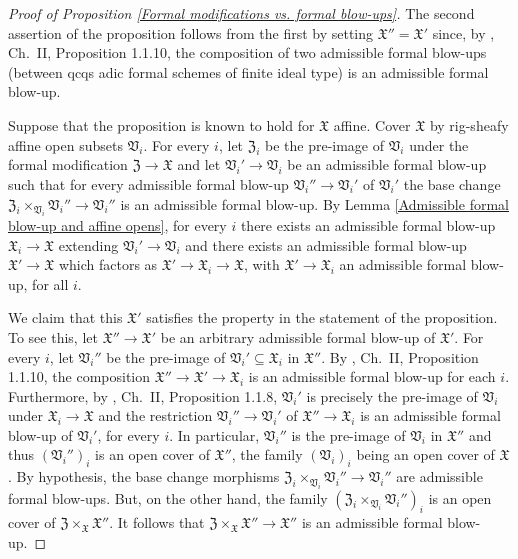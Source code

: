 \documentclass[12pt,twoside,a4paper]{article}
\theoremstyle{definition}
\theoremstyle{remark}
\begin{document}
\begin{proof}[Proof of Proposition \ref{Formal modifications vs. formal blow-ups}]The second assertion of the proposition follows from the first by setting $\mathfrak{X}''=\mathfrak{X}'$ since, by \cite{FK}, Ch.~II, Proposition 1.1.10, the composition of two admissible formal blow-ups (between qcqs adic formal schemes of finite ideal type) is an admissible formal blow-up. 

Suppose that the proposition is known to hold for $\mathfrak{X}$ affine. Cover $\mathfrak{X}$ by rig-sheafy affine open subsets $\mathfrak{V}_{i}$. For every $i$, let $\mathfrak{Z}_{i}$ be the pre-image of $\mathfrak{V}_{i}$ under the formal modification $\mathfrak{Z}\to\mathfrak{X}$ and let $\mathfrak{V}_{i}'\to\mathfrak{V}_{i}$ be an admissible formal blow-up such that for every admissible formal blow-up $\mathfrak{V}_{i}''\to\mathfrak{V}_{i}'$ of $\mathfrak{V}_{i}'$ the base change $\mathfrak{Z}_{i}\times_{\mathfrak{V}_{i}}\mathfrak{V}_{i}''\to\mathfrak{V}_{i}''$ is an admissible formal blow-up. By Lemma \ref{Admissible formal blow-up and affine opens}, for every $i$ there exists an admissible formal blow-up $\mathfrak{X}_{i}\to\mathfrak{X}$ extending $\mathfrak{V}_{i}'\to\mathfrak{V}_{i}$ and there exists an admissible formal blow-up $\mathfrak{X}'\to \mathfrak{X}$ which factors as $\mathfrak{X}'\to\mathfrak{X}_{i}\to\mathfrak{X}$, with $\mathfrak{X}'\to\mathfrak{X}_{i}$ an admissible formal blow-up, for all $i$. 

We claim that this $\mathfrak{X}'$ satisfies the property in the statement of the proposition. To see this, let $\mathfrak{X}''\to\mathfrak{X}'$ be an arbitrary admissible formal blow-up of $\mathfrak{X}'$. For every $i$, let $\mathfrak{V}_{i}''$ be the pre-image of $\mathfrak{V}_{i}'\subseteq \mathfrak{X}_{i}$ in $\mathfrak{X}''$. By \cite{FK}, Ch.~II, Proposition 1.1.10, the composition $\mathfrak{X}''\to\mathfrak{X}'\to \mathfrak{X}_{i}$ is an admissible formal blow-up for each $i$. Furthermore, by \cite{FK}, Ch.~II, Proposition 1.1.8, $\mathfrak{V}_{i}'$ is precisely the pre-image of $\mathfrak{V}_{i}$ under $\mathfrak{X}_{i}\to\mathfrak{X}$ and the restriction $\mathfrak{V}_{i}''\to \mathfrak{V}_{i}'$ of $\mathfrak{X}''\to\mathfrak{X}_{i}$ is an admissible formal blow-up of $\mathfrak{V}_{i}'$, for every $i$. In particular, $\mathfrak{V}_{i}''$ is the pre-image of $\mathfrak{V}_{i}$ in $\mathfrak{X}''$ and thus $(\mathfrak{V}_{i}'')_{i}$ is an open cover of $\mathfrak{X}''$, the family $(\mathfrak{V}_{i})_{i}$ being an open cover of $\mathfrak{X}$. By hypothesis, the base change morphisms $\mathfrak{Z}_{i}\times_{\mathfrak{V}_{i}}\mathfrak{V}_{i}''\to\mathfrak{V}_{i}''$ are admissible formal blow-ups. But, on the other hand, the family $(\mathfrak{Z}_{i}\times_{\mathfrak{V}_{i}}\mathfrak{V}_{i}'')_{i}$ is an open cover of $\mathfrak{Z}\times_{\mathfrak{X}}\mathfrak{X}''$. It follows that $\mathfrak{Z}\times_{\mathfrak{X}}\mathfrak{X}''\to\mathfrak{X}''$ is an admissible formal blow-up. 


\end{proof}
\end{document}
